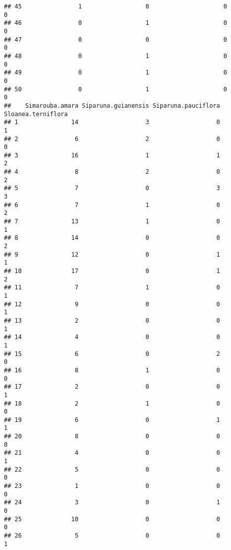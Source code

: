 \documentclass[
]{article}
\begin{document}
\begin{verbatim}
## 45                1                  0                     0               0
## 46                0                  1                     0               0
## 47                0                  0                     0               0
## 48                0                  1                     0               0
## 49                0                  1                     0               0
## 50                0                  1                     0               0
##    Simarouba.amara Siparuna.guianensis Siparuna.pauciflora Sloanea.terniflora
## 1               14                   3                   0                  1
## 2                6                   2                   0                  0
## 3               16                   1                   1                  2
## 4                8                   2                   0                  2
## 5                7                   0                   3                  3
## 6                7                   1                   0                  2
## 7               13                   1                   0                  1
## 8               14                   0                   0                  2
## 9               12                   0                   1                  1
## 10              17                   0                   1                  2
## 11               7                   1                   0                  1
## 12               9                   0                   0                  1
## 13               2                   0                   0                  1
## 14               4                   0                   0                  1
## 15               6                   0                   2                  0
## 16               8                   1                   0                  0
## 17               2                   0                   0                  1
## 18               2                   1                   0                  0
## 19               6                   0                   1                  1
## 20               8                   0                   0                  0
## 21               4                   0                   0                  1
## 22               5                   0                   0                  0
## 23               1                   0                   0                  0
## 24               3                   0                   1                  0
## 25              10                   0                   0                  0
## 26               5                   0                   0                  1

\end{verbatim}
\end{document}
